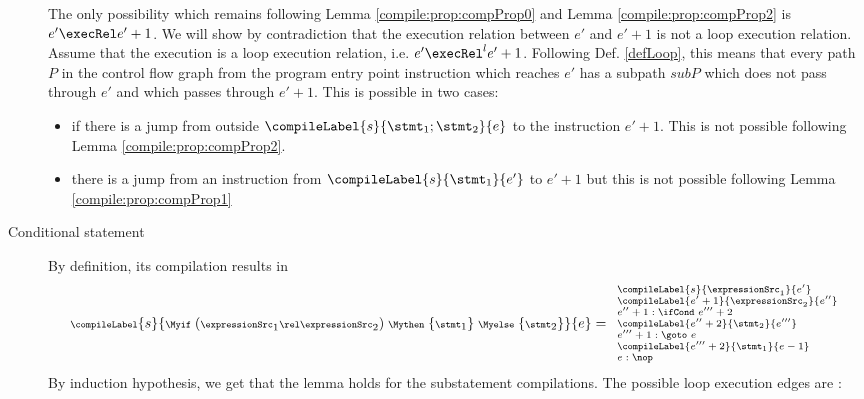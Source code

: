\begin{description}
The only possibility which remains following
  Lemma \ref{compile:prop:compProp0} and Lemma \ref{compile:prop:compProp2}  is
$e' \execRel e'+1$. We will show  by contradiction that the execution relation between $e'$ and $e'+1$ is not a loop execution relation.
Assume that the execution is a loop execution relation, i.e. $e' \execRel^{l} e'+1$. Following Def. \ref{defLoop}, this means that every path $P$ in the control flow graph 
 from the program entry point instruction which reaches $e'$ has a subpath $ subP $ which does not pass through $e'$ and which passes through $e'+1$.
 This is possible in two cases:
\begin{itemize}
\item  if there is a jump from outside $\compileLabel{s}{\stmt_1;\stmt_2}{e}$ to the instruction $e'+1$. This is not possible following Lemma \ref{compile:prop:compProp2}.

\item there is a jump from an instruction from $\compileLabel{s}{\stmt_1}{e'}$ to  $e'+1$ but this is not possible following Lemma \ref{compile:prop:compProp1}
\end{itemize}


\item[Conditional statement]
By definition, its compilation results in
  $$ \scriptsize{\compileLabel{s}{ \Myif \ ( \expressionSrc_1 \rel \expressionSrc_2 ) \ \Mythen \ \{ \stmt_1 \} \  \Myelse \ \{ \stmt_2 \}   }{e} = 
\begin{array}{l}
  \compileLabel{s}{\expressionSrc_1}{e'}\\
  \compileLabel{e'+1}{\expressionSrc_2}{e''}\\  
  e'' + 1: \ifCond \ e''' + 2 \\
  \compileLabel{e'' + 2}{\stmt_2}{e'''}\\ 
  e''' + 1: \goto \ e \\ 
  \compileLabel{e''' +  2}{\stmt_1}{ e -1  }\\ 
  e: \nop 
\end{array}}
$$
 By induction hypothesis, we get that the lemma holds for the substatement compilations. The possible loop execution edges are :


\end{description}
